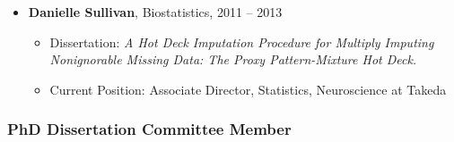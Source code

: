 \documentclass[
  english,
  letterpaper,
  DIV=11,
  numbers=noendperiod]{scrartcl}
\providecommand{\tightlist}{%
  \setlength{\itemsep}{0pt}\setlength{\parskip}{0pt}}
\begin{document}
\begin{itemize}
  \begin{itemize}
  \tightlist
  \item
    Dissertation: \emph{Systematically Missing Subject-Level Data in
    Longitudinal Research Synthesis}
  \item
    Current Position: Associate Professor (tenured), Department of
    Biostatistics and Data Science, Wake Forest School of Medicine
  \end{itemize}
\item
  \textbf{Danielle Sullivan}, Biostatistics, 2011 -- 2013

  \begin{itemize}
  \tightlist
  \item
    Dissertation: \emph{A Hot Deck Imputation Procedure for Multiply
    Imputing Nonignorable Missing Data: The Proxy Pattern-Mixture Hot
    Deck.}
  \item
    Current Position: Associate Director, Statistics, Neuroscience at
    Takeda
  \end{itemize}
\end{itemize}

\subsubsection{PhD Dissertation Committee
Member}\label{phd-dissertation-committee-member}
\end{document}
